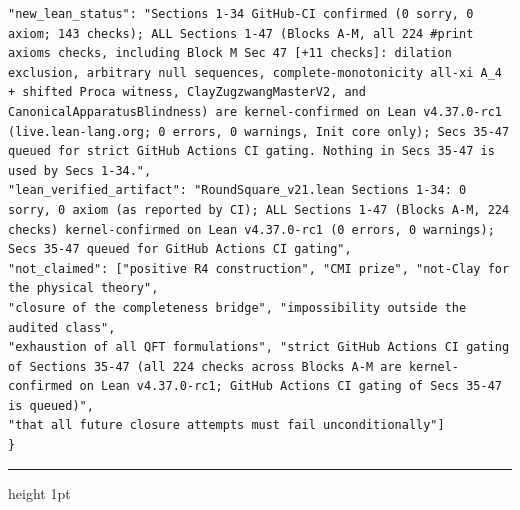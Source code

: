 \documentclass[11pt,a4paper]{article}
\theoremstyle{plain}
\theoremstyle{definition}
\theoremstyle{remark}
\renewcommand{\_}{\oldunderscore\allowbreak}
\begin{document}
\begin{Verbatim}[fontsize=\scriptsize,frame=single,rulecolor=\color{darkgray}]
"new_lean_status": "Sections 1-34 GitHub-CI confirmed (0 sorry, 0 axiom; 143 checks); ALL Sections 1-47 (Blocks A-M, all 224 #print axioms checks, including Block M Sec 47 [+11 checks]: dilation exclusion, arbitrary null sequences, complete-monotonicity all-xi A_4 + shifted Proca witness, ClayZugzwangMasterV2, and CanonicalApparatusBlindness) are kernel-confirmed on Lean v4.37.0-rc1 (live.lean-lang.org; 0 errors, 0 warnings, Init core only); Secs 35-47 queued for strict GitHub Actions CI gating. Nothing in Secs 35-47 is used by Secs 1-34.",
"lean_verified_artifact": "RoundSquare_v21.lean Sections 1-34: 0 sorry, 0 axiom (as reported by CI); ALL Sections 1-47 (Blocks A-M, 224 checks) kernel-confirmed on Lean v4.37.0-rc1 (0 errors, 0 warnings); Secs 35-47 queued for GitHub Actions CI gating",
"not_claimed": ["positive R4 construction", "CMI prize", "not-Clay for the physical theory",
"closure of the completeness bridge", "impossibility outside the audited class",
"exhaustion of all QFT formulations", "strict GitHub Actions CI gating of Sections 35-47 (all 224 checks across Blocks A-M are kernel-confirmed on Lean v4.37.0-rc1; GitHub Actions CI gating of Secs 35-47 is queued)",
"that all future closure attempts must fail unconditionally"]
}
\end{Verbatim}
\vspace{4pt}\hrule height 1pt\vspace{6pt}
\end{document}
